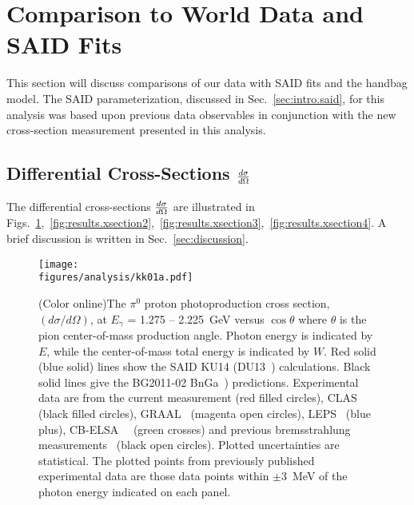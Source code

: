 \section{Comparison to World Data and SAID Fits}\label{sec:results.conclusion}
This section will discuss comparisons of our data with SAID fits and the  handbag model. The SAID parameterization, discussed in Sec.~\ref{sec:intro.said}, for this analysis was based upon previous data observables in conjunction with the new cross-section measurement presented in this analysis.

\subsection{Differential Cross-Sections $\frac{\lowercase{d}\sigma}{\lowercase{d}\Omega}$}\label{diffXsection}
The differential cross-sections $\frac{\lowercase{d}\sigma}{\lowercase{d}\Omega}$ are illustrated in Figs.~\ref{fig:results.xsection1},~\ref{fig:results.xsection2},~\ref{fig:results.xsection3},~\ref{fig:results.xsection4}. A brief discussion is written in Sec.~\ref{sec:discussion}.
\begin{figure}[h!]\begin{center}
\texttt{[image: \\figures/analysis/kk01a.pdf]}
\caption[The $\pi^0$ proton photoproduction cross section, $(d\sigma/d\Omega)$, at $E_{\gamma}$ = 1.275 -- 2.225~GeV versus $\cos\theta$ where $\theta$ is the pion center-of-mass production angle]{\label{fig:results.xsection1}(Color online)The $\pi^0$ proton photoproduction cross section, $(d\sigma/d\Omega)$, at $E_{\gamma}$ = 1.275 -- 2.225~GeV versus $\cos\theta$ where $\theta$ is the pion center-of-mass production angle. Photon energy is indicated by $E$, while the center-of-mass total energy is indicated by $W$. Red solid (blue solid) lines show the SAID KU14 (DU13~\protect\cite{Dugger13}) calculations. Black solid lines give the BG2011-02 BnGa~\protect\cite{BonnGat}) predictions. Experimental data are from the current measurement (red filled circles), CLAS~\protect\cite{Dugger07} (black filled circles), GRAAL~\protect\cite{Graal} (magenta open circles), LEPS~\protect\cite{LEPS} (blue plus), CB-ELSA~\protect\cite{ELSA05}~\cite{ELSA11} (green crosses) and previous bremsstrahlung measurements~\protect\cite{brem} (black open circles). Plotted uncertainties are statistical. The plotted points from previously published experimental data are those data points within $\pm$3~MeV of the photon energy indicated on each panel.}
\end{center}\end{figure} 

